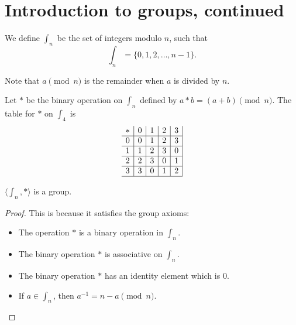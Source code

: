 
\section{Introduction to groups, continued}
    \renewcommand{\leftmark}{January 29, 2024}
    \begin{dfn}
        We define \(\int_n\) be the set of integers modulo \(n\), such that \[\int_n = \{0, 1, 2, \ldots, n - 1\}.\] 

        Note that \(a \pmod{n}\) is the remainder when \(a\) is divided by \(n\).
    \end{dfn}

    \begin{example}
        Let \(*\) be the binary operation on \(\int_n\) defined by \(a * b = (a + b)\pmod{n}\). The table for \(*\) on \(\int_4\) is
        \[
            \begin{array}{c|c|c|c|c|}
                * & 0 & 1 & 2 & 3 \\ \hline
                0 & 0 & 1 & 2 & 3 \\ \hline
                1 & 1 & 2 & 3 & 0 \\ \hline
                2 & 2 & 3 & 0 & 1 \\ \hline
                3 & 3 & 0 & 1 & 2 \\ \hline
            \end{array}
        \]
    \end{example}

    \begin{thm}
        \(\langle \int_n, * \rangle\) is a group.
    \end{thm}

    \begin{proof}
        This is because it satisfies the group axioms:
        \begin{itemize}
            \item The operation \(*\) is a binary operation in \(\int_n\).
            \item The binary operation \(*\) is associative on \(\int_n\).
            \item The binary operation \(*\) has an identity element which is \(0\).
            \item If \(a\in\int_n\), then \(a^{-1} = n - a \pmod{n}\).
        \end{itemize}
    \end{proof}

